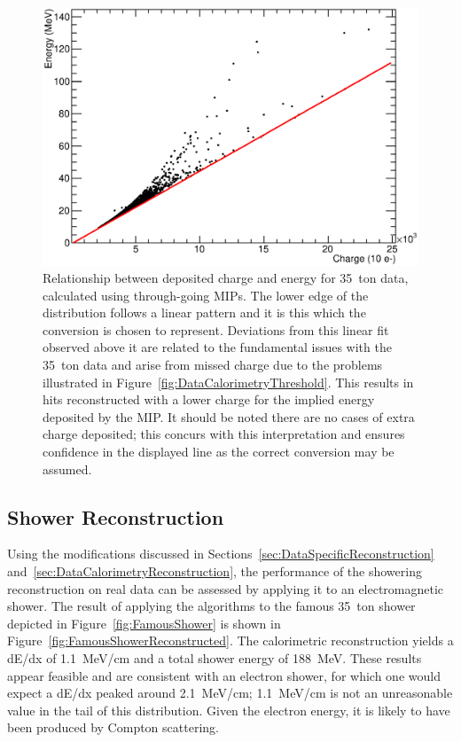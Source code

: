 \begin{figure}
  \centering
  \includegraphics[width=12cm]{ChargeEnergy.eps}
  \caption[Relationship between deposited charge and energy for 35~ton data, calculated using through-going MIPs.]{Relationship between deposited charge and energy for 35~ton data, calculated using through-going MIPs.  The lower edge of the distribution follows a linear pattern and it is this which the conversion is chosen to represent.  Deviations from this linear fit observed above it are related to the fundamental issues with the 35~ton data and arise from missed charge due to the problems illustrated in Figure~\ref{fig:DataCalorimetryThreshold}.  This results in hits reconstructed with a lower charge for the implied energy deposited by the MIP.  It should be noted there are no cases of extra charge deposited; this concurs with this interpretation and ensures confidence in the displayed line as the correct conversion may be assumed.}
  \label{fig:DataCalorimetryShowerEnergy}
\end{figure}

\subsection{Shower Reconstruction}\label{sec:DataShowerReconstruction}

Using the modifications discussed in Sections~\ref{sec:DataSpecificReconstruction} and~\ref{sec:DataCalorimetryReconstruction}, the performance of the showering reconstruction on real data can be assessed by applying it to an electromagnetic shower.  The result of applying the algorithms to the famous 35~ton shower depicted in Figure~\ref{fig:FamousShower} is shown in Figure~\ref{fig:FamousShowerReconstructed}.  The calorimetric reconstruction yields a dE/dx of 1.1~MeV/cm and a total shower energy of 188~MeV.  These results appear feasible and are consistent with an electron shower, for which one would expect a dE/dx peaked around 2.1~MeV/cm; 1.1~MeV/cm is not an unreasonable value in the tail of this distribution.  Given the electron energy, it is likely to have been produced by Compton scattering.


